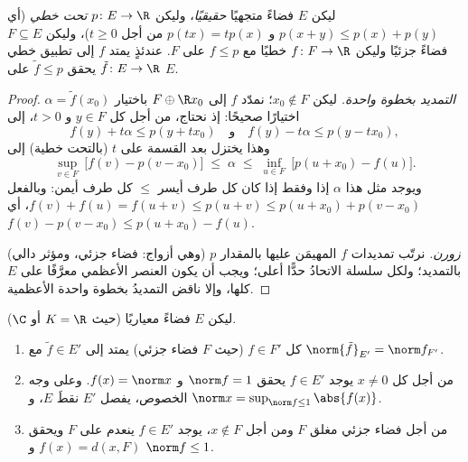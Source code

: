 \begin{theorem}
\label{thm:b3:banach:hahnbanach}
ليكن $E$ فضاءً متجهيًا \emph{حقيقيًا}، وليكن $p \colon E \to \R$ \emph{تحت
خطي} (أي $p(x + y) \leq p(x) + p(y)$ و $p(tx) =
tp(x)$ من أجل $t \geq 0$)، وليكن
$F \subseteq E$ فضاءً جزئيًا وليكن $f
\colon F \to \R$ خطيًا مع $f \leq p$
على $F$. عندئذٍ يمتد $f$ إلى تطبيق خطي $\tilde f \colon E \to \R$ يحقق $\tilde f \leq p$ على
$E$.
\end{theorem}

\begin{proof}
\emph{التمديد بخطوة واحدة.} ليكن $x_0 \notin F$؛ نمدّد $f$ إلى
$F \oplus \R x_0$ باختيار $\alpha = \tilde f(x_0)$ اختيارًا صحيحًا: إذ نحتاج، من أجل كل
$y \in F$ و $t > 0$، إلى
\[
f(y) + t\alpha \leq p(y + tx_0)
\quad\text{و}\quad
f(y) - t\alpha \leq p(y - tx_0),
\]
وهذا يختزل بعد القسمة على $t$ (بالتحت خطية) إلى
\[
\sup_{v \in F}\ \bigl[f(v) - p(v - x_0)\bigr]
\;\leq\; \alpha \;\leq\;
\inf_{u \in F}\ \bigl[p(u + x_0) - f(u)\bigr].
\]
ويوجد مثل هذا $\alpha$ إذا وفقط إذا كان كل طرف أيسر $\leq$ كل
طرف أيمن: وبالفعل $f(v) + f(u) = f(u + v) \leq p(u + v) \leq
p(u + x_0) + p(v - x_0)$، أي $f(v) - p(v - x_0) \leq p(u +
x_0) - f(u)$.

\emph{زورن.} نرتّب تمديدات $f$ المهيمَن عليها بالمقدار $p$ (وهي أزواج:
فضاء جزئي، ومؤثر دالي) بالتمديد؛ ولكل سلسلة الاتحادُ حدًّا
أعلى؛ ويجب أن يكون العنصر الأعظمي معرَّفًا على $E$ كلها، وإلا
ناقض التمديدُ بخطوة واحدة الأعظمية.
\end{proof}

\begin{corollary}\label{cor:b3:banach:hbnormed}
ليكن $E$ فضاءً معياريًا (حيث $K = \R$ أو $\C$).
\begin{enumerate}
  \item كل $f \in F'$ (حيث $F$ فضاء جزئي) يمتد إلى $\tilde f
        \in E'$ مع
        $\norm{\tilde f}_{E'} = \norm f_{F'}$.
  \item من أجل كل $x \neq 0$ يوجد $f \in E'$ يحقق $\norm f
        = 1$
        و $f(x) = \norm x$. وعلى وجه الخصوص، يفصل $E'$ نقطَ
        $E$، و $\norm x = \sup_{\norm f \leq
        1}\abs{f(x)}$.
  \item من أجل فضاء جزئي مغلق $F$ ومن أجل $x \notin F$، يوجد
        $f
        \in E'$ ينعدم على $F$ ويحقق $f(x) = d(x, F)$
        و $\norm f \leq 1$.
\end{enumerate}
\end{corollary}

